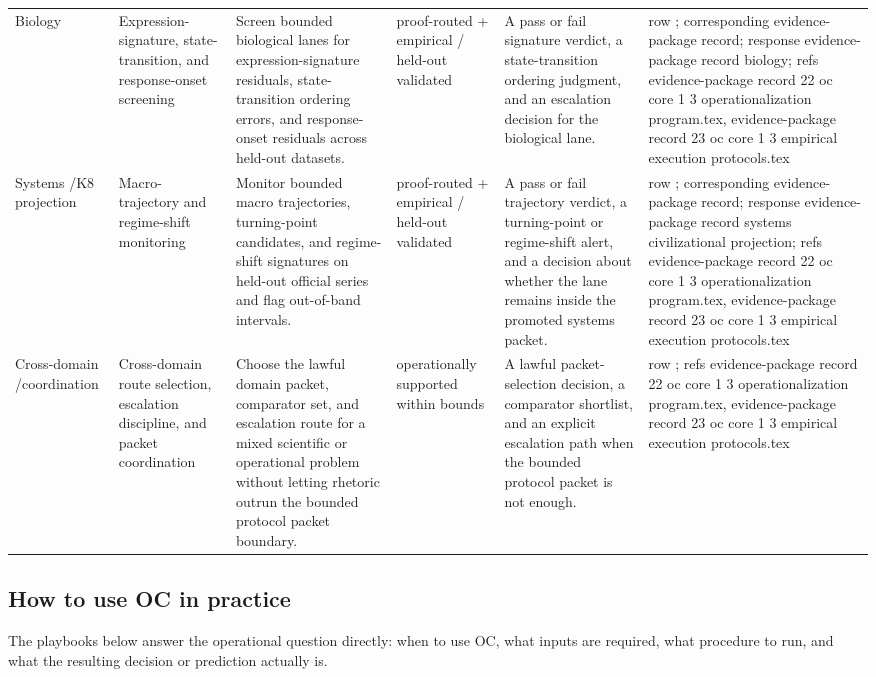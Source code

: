 \begin{longtable}{@{}L{0.11\textwidth}L{0.16\textwidth}L{0.19\textwidth}L{0.12\textwidth}L{0.18\textwidth}L{0.16\textwidth}@{}}
Biology & Expression-signature, state-transition, and response-onset screening & Screen bounded biological lanes for expression-signature residuals, state-transition ordering errors, and response-onset residuals across held-out datasets. & proof-routed + empirical / held-out validated & A pass or fail signature verdict, a state-transition ordering judgment, and an escalation decision for the biological lane. & row ; corresponding evidence-package record; \allowbreak response evidence-package record biology; \allowbreak refs evidence-package record 22 oc core 1 3 operationalization program.tex, \allowbreak evidence-package record 23 oc core 1 3 empirical execution protocols.tex \\
Systems /\allowbreak K8 projection & Macro-trajectory and regime-shift monitoring & Monitor bounded macro trajectories, turning-point candidates, and regime-shift signatures on held-out official series and flag out-of-band intervals. & proof-routed + empirical / held-out validated & A pass or fail trajectory verdict, a turning-point or regime-shift alert, and a decision about whether the lane remains inside the promoted systems packet. & row ; corresponding evidence-package record; \allowbreak response evidence-package record systems civilizational projection; \allowbreak refs evidence-package record 22 oc core 1 3 operationalization program.tex, \allowbreak evidence-package record 23 oc core 1 3 empirical execution protocols.tex \\
Cross-domain /\allowbreak coordination & Cross-domain route selection, escalation discipline, and packet coordination & Choose the lawful domain packet, comparator set, and escalation route for a mixed scientific or operational problem without letting rhetoric outrun the bounded protocol packet boundary. & operationally supported within bounds & A lawful packet-selection decision, a comparator shortlist, and an explicit escalation path when the bounded protocol packet is not enough. & row ; \allowbreak refs evidence-package record 22 oc core 1 3 operationalization program.tex, \allowbreak evidence-package record 23 oc core 1 3 empirical execution protocols.tex \\
\bottomrule
\end{longtable}
\endgroup

\subsection{How to use OC in practice}
The playbooks below answer the operational question directly: when to use OC, what inputs are required, what procedure to run, and what the resulting decision or prediction actually is.

